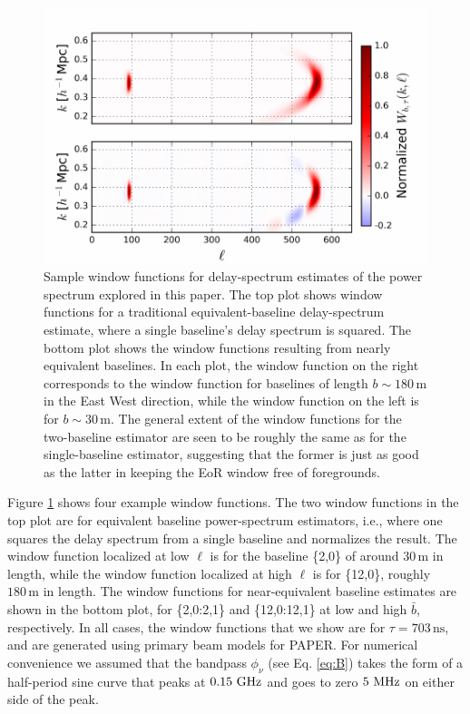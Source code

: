 \documentclass[twocolumn,apj,numberedappendix]{emulateapj}
\renewcommand\[{\begin{equation}}
\renewcommand\]{\end{equation}}
\begin{document}
\begin{figure}[h]
\includegraphics[width=1.1\linewidth]{multiblwindows}
\caption{Sample window functions for delay-spectrum estimates of the power spectrum explored in this paper. The top plot shows window functions for a traditional equivalent-baseline delay-spectrum estimate, where a single baseline's delay spectrum is squared. The bottom plot shows the window functions resulting from nearly equivalent baselines. In each plot, the window function on the right corresponds to the window function for baselines of length $b \sim 180\,\textrm{m}$ in the East West direction, while the window function on the left is for $b\sim 30\,\textrm{m}$. The general extent of the window functions for the two-baseline estimator are seen to be roughly the same as for the single-baseline estimator, suggesting that the former is just as good as the latter in keeping the EoR window free of foregrounds.}
\label{fig:multiblwindows}
\end{figure}


Figure \ref{fig:multiblwindows} shows four example window functions. The two window functions in the top plot are for equivalent baseline power-spectrum estimators, i.e., where one squares the delay spectrum from a single baseline and normalizes the result. The window function localized at low $\ell$ is for the baseline \{2,0\} of around $30\,\textrm{m}$ in length, while the window function localized at high $\ell$ is for \{12,0\}, roughly $180\,\textrm{m}$ in length. The window functions for near-equivalent baseline estimates are shown in the bottom plot, for \{2,0:2,1\} and \{12,0:12,1\} at low and high $\bar{b}$, respectively. In all cases, the window functions that we show are for $\tau = 703\,\textrm{ns}$, and are generated using primary beam models for PAPER. For numerical convenience we assumed that the bandpass $\phi_\nu$ (see Eq. \eqref{eq:B}) takes the form of a half-period sine curve that peaks at $0.15\,\textrm{\,GHz}$ and goes to zero $5\,\textrm{\,MHz}$ on either side of the peak.
\end{document}
